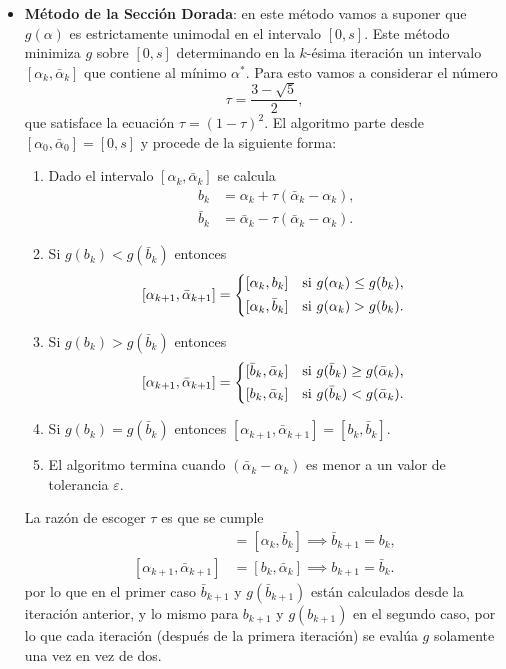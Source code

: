 \begin{itemize}
	\item \textbf{Método de la Sección Dorada}: en este método vamos a suponer que \(g(\alpha)\) es estrictamente unimodal en el intervalo \([0, s]\). Este método minimiza \(g\) sobre \([0, s]\) determinando en la \(k\)-ésima iteración un intervalo \([\alpha_k, \bar{\alpha}_k]\) que contiene al mínimo \(\alpha^{\ast}\). Para esto vamos a considerar el número
	\begin{equation*}
	\tau = \frac{3 - \sqrt{5}}{2},
	\end{equation*}
	que satisface la ecuación \(\tau = (1-\tau)^2\). El algoritmo parte desde \([\alpha_0, \bar{\alpha}_0] = [0, s]\) y procede de la siguiente forma:
	\begin{enumerate}
		\item Dado el intervalo \([\alpha_k, \bar{\alpha}_k]\) se calcula
		\begin{align*}
		b_k			&= \alpha_k + \tau (\bar{\alpha}_k - \alpha_k),\\
		\bar{b}_k	&= \bar{\alpha}_k - \tau (\bar{\alpha}_k - \alpha_k).
		\end{align*}
		\item Si \(g(b_k) < g(\bar{b}_k)\) entonces
		\[ [\alpha_{k+1}, \bar{\alpha}_{k+1}] =
		\begin{dcases*}
		[\alpha_k, b_{k}]		& si \(g(\alpha_k) \leq g(b_k)\),\\
		[\alpha_k, \bar{b}_k]	& si \(g(\alpha_k) > g(b_k)\).
		\end{dcases*}
		\]
		\item Si \(g(b_k) > g(\bar{b}_k)\) entonces
		\[ [\alpha_{k+1}, \bar{\alpha}_{k+1}] =
		\begin{dcases*}
		[\bar{b}_k, \bar{\alpha}_k]	& si \(g(\bar{b}_k) \geq g(\bar{\alpha}_k)\), \\
		[b_k, \bar{\alpha}_k]		& si \(g(\bar{b}_k) < g(\bar{\alpha}_k)\).
		\end{dcases*}
		\]
		\item Si \(g(b_k) = g(\bar{b}_k)\) entonces \([\alpha_{k+1}, \bar{\alpha}_{k+1}] = [b_k, \bar{b}_k]\).
		\item El algoritmo termina cuando \((\bar{\alpha}_k - \alpha_k)\) es menor a un valor de tolerancia \(\varepsilon\).
	\end{enumerate}
	La razón de escoger \(\tau\) es que se cumple
	\begin{align*}
	[\alpha_{k+1}, \bar{\alpha}_{k+1}]	&= [\alpha_k, \bar{b}_k] \implies \bar{b}_{k+1} = b_k,\\
	[\alpha_{k+1}, \bar{\alpha}_{k+1}]	&= [b_k, \bar{\alpha}_k] \implies b_{k+1} = \bar{b}_k.
	\end{align*}
	por lo que en el primer caso \(\bar{b}_{k+1}\) y \(g(\bar{b}_{k+1})\) están calculados desde la iteración anterior, y lo mismo para \(b_{k+1}\) y \(g(b_{k+1})\) en el segundo caso, por lo que cada iteración (después de la primera iteración) se evalúa \(g\) solamente una vez en vez de dos.
	

\end{itemize}
